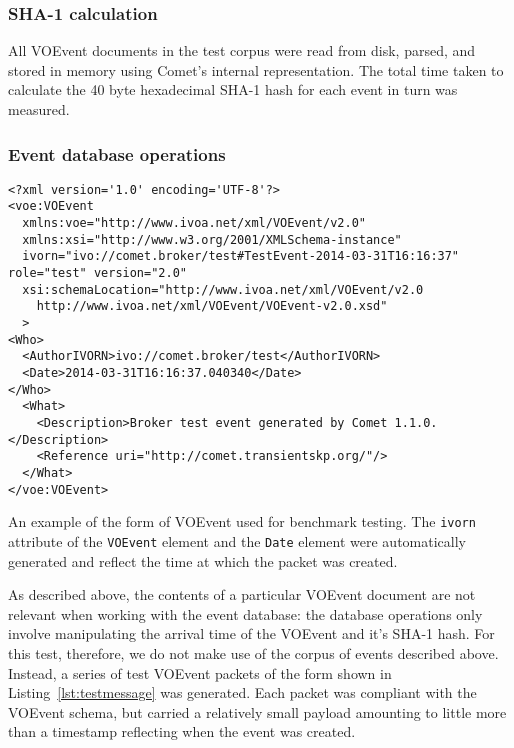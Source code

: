 \documentclass[5p,authoryear]{elsarticle}
\begin{document}
\subsubsection{SHA-1 calculation}
\label{sec:perf:individual:hash}

All VOEvent documents in the test corpus were read from disk, parsed, and
stored in memory using Comet's internal representation. The total time taken
to calculate the 40 byte hexadecimal SHA-1 hash for each event in turn was
measured.

\subsubsection{Event database operations}
\label{sec:perf:individual:eventdb}

\begin{listing*}
\begin{verbatim}
<?xml version='1.0' encoding='UTF-8'?>
<voe:VOEvent
  xmlns:voe="http://www.ivoa.net/xml/VOEvent/v2.0"
  xmlns:xsi="http://www.w3.org/2001/XMLSchema-instance"
  ivorn="ivo://comet.broker/test#TestEvent-2014-03-31T16:16:37" role="test" version="2.0"
  xsi:schemaLocation="http://www.ivoa.net/xml/VOEvent/v2.0
    http://www.ivoa.net/xml/VOEvent/VOEvent-v2.0.xsd"
  >
<Who>
  <AuthorIVORN>ivo://comet.broker/test</AuthorIVORN>
  <Date>2014-03-31T16:16:37.040340</Date>
</Who>
  <What>
    <Description>Broker test event generated by Comet 1.1.0.</Description>
    <Reference uri="http://comet.transientskp.org/"/>
  </What>
</voe:VOEvent>
\end{verbatim}
\caption{An example of the form of VOEvent used for benchmark testing. The
\texttt{ivorn} attribute of the \texttt{VOEvent} element and the \texttt{Date}
element were automatically generated and reflect the time at which the packet
was created.}
\label{lst:testmessage}
\end{listing*}

As described above, the contents of a particular VOEvent document are not
relevant when working with the event database: the database operations only
involve manipulating the arrival time of the VOEvent and it's SHA-1 hash. For
this test, therefore, we do not make use of the corpus of events described
above. Instead, a series of test VOEvent packets of the form shown in
Listing~\ref{lst:testmessage} was generated.  Each packet was compliant with
the VOEvent schema, but carried a relatively small payload amounting to little
more than a timestamp reflecting when the event was created.
\end{document}
